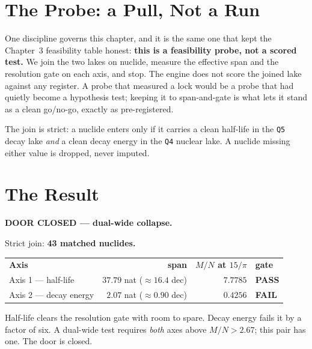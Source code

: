 \documentclass[11pt, letterpaper, openany]{book}
\begin{document}
\section{The Probe: a Pull, Not a Run}

One discipline governs this chapter, and it is the same one that kept the Chapter~3 feasibility
table honest: \textbf{this is a feasibility probe, not a scored test.} We join the two lakes on
nuclide, measure the effective span and the resolution gate on each axis, and stop. The engine does
not score the joined lake against any register. A probe that measured a lock would be a probe that
had quietly become a hypothesis test; keeping it to span-and-gate is what lets it stand as a clean
go/no-go, exactly as pre-registered.

The join is strict: a nuclide enters only if it carries a clean half-life in the \texttt{Q5} decay
lake \emph{and} a clean decay energy in the \texttt{Q4} nuclear lake. A nuclide missing either value
is dropped, never imputed.

\section{The Result}

\begin{nullbox}
\textbf{DOOR CLOSED --- dual-wide collapse.}

\medskip
Strict join: \textbf{43 matched nuclides.}

\medskip
\begin{tabular}{@{}lrrl@{}}
\textbf{Axis} & \textbf{span} & \textbf{$M/N$ at $15/\pi$} & \textbf{gate} \\[2pt]
Axis 1 --- half-life & $37.79$ nat ($\approx 16.4$ dec) & $7.7785$ & \textbf{\color{signalgreen}PASS} \\
Axis 2 --- decay energy & $2.07$ nat ($\approx 0.90$ dec) & $0.4256$ & \textbf{\color{signalred}FAIL} \\
\end{tabular}

\medskip
Half-life clears the resolution gate with room to spare. Decay energy fails it by a factor of six.
A dual-wide test requires \emph{both} axes above $M/N > 2.67$; this pair has one. The door is closed.
\end{nullbox}
\end{document}
